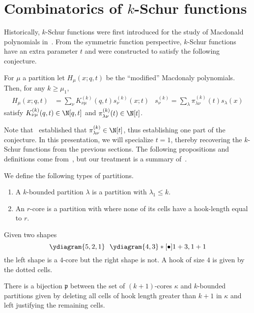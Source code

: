 \documentclass[11pt,leqno,oneside]{amsart}
\numberwithin{thm}{section}
\begin{document}
\section{Combinatorics of \(k\)-Schur functions}\label{combinatorics}
Historically, \(k\)-Schur functions were first introduced for the
study of Macdonald polynomials in~\cite{llm}. From the symmetric function
perspective, \(k\)-Schur functions have an extra parameter \(t\) and
were constructed to satisfy the following conjecture.
\begin{conj}
  For \(\mu\) a partition let \(H_\mu(x;q,t)\) be the ``modified''
  Macdonaly polynomials. Then, for any \(k \geq \mu_1\),
  \begin{align*}
    H_\mu(x;q,t)
    &= \sum_\nu K_{\nu\mu}^{(k)}(q,t) s_\nu^{(k)}(x;t)
    & s_\nu^{(k)} = \sum_\lambda \pi_{\lambda \nu}^{(k)}(t) s_\lambda(x)
  \end{align*}
  satisfy \(K_{\nu \mu}^{(k)}(q,t) \in \N[q,t]\) and \(\pi_{\lambda
    \nu}^{(k)}(t) \in \N[t]\). 
\end{conj}
Note that~\cite{catalans} established that \(\pi_{\lambda \nu}^{(k)}
\in \N[t]\), thus establishing one part of the conjecture. In this
presentation, we will specialize \(t=1\), thereby recovering the
\(k\)-Schur functions from the previous sections. The following
propositions and definitions come from~\cite{lm1, lm2}, but our
treatment is a summary of~\cite{k-schur-book}.
\begin{defn}
  We define the following types of partitions.
  \begin{enumerate}
  \item A \(k\)-bounded partition \(\lambda\) is a partition with
    \(\lambda_1 \leq k\).
  \item An \(r\)-core is a partition with where none of its cells
    have a hook-length equal to \(r\).
  \end{enumerate}
\end{defn}
\begin{example}
  Given two shapes \[
    \ydiagram{5,2,1} \ \ \ydiagram{4,3}*[\bullet]{1+3,1+1}
  \]
  the left shape is a \(4\)-core but the right shape is not. A hook of
  size \(4\) is given by the dotted cells.
\end{example}
\begin{prop}
  There is a bijection \(\mathfrak{p}\) between the set of \((k+1)\)-cores \(\kappa\)
  and \(k\)-bounded partitions given by deleting all cells of hook
  length greater than \(k+1\) in \(\kappa\) and left justifying the
  remaining cells.
\end{prop}
\end{document}
